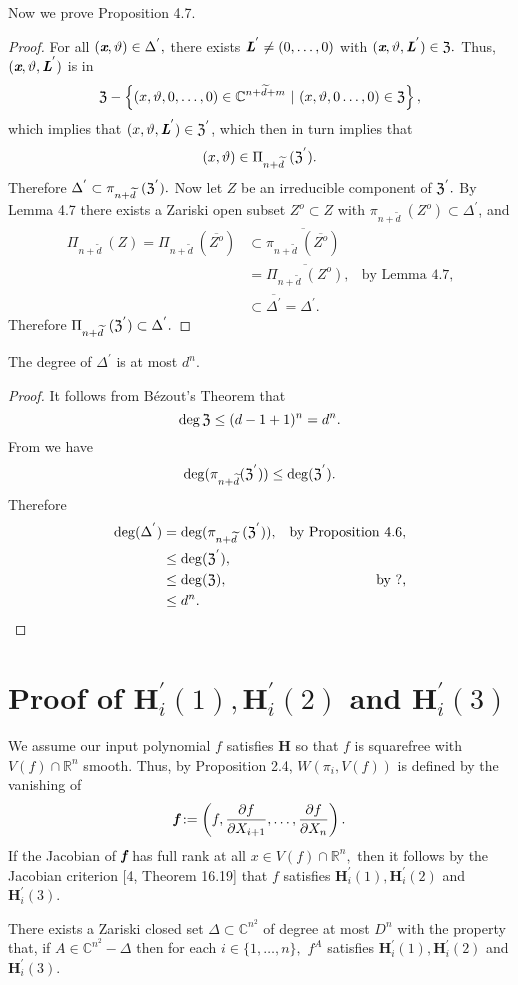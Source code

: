 \documentclass[sigconf]{acmart}
\def\fb{\textit{\textbf{f}}}
\def\C{\mathbb{C}}
\def\vt{\vartheta}
\def\dt{\widetilde{d}}
\def\pa{\partial}
\def\D{\Delta}
\def\Z{\frak{Z}}
\begin{document}
%
Now we prove Proposition 4.7.
%
\begin{proof}
For all $(\textit{\textbf{x}},\vt) \in \D^{'}, $ there exists $\textit{\textbf{L}}^{'} \not = (0,\hdots,0)$ with $(\textit{\textbf{x}},\vt,\textit{\textbf{L}}^{'}) \in \Z.$ Thus, $(\textit{\textbf{x}},\vt,\textit{\textbf{L}}^{'})$ is in
\[
     \Z - \left\{(x,\vt,0,\hdots,0) \in \C^{n+\dt+m}~|~(x,\vt,0\hdots,0) \in \Z\right\}, 
\]
which implies that $(x,\vt,\textit{\textbf{L}}^{'}) \in \Z^{'}$, which then in turn implies that
\[
    (x,\vt) \in \Pi_{n + \dt}~(\Z^{'}).
\]
Therefore $\D^{'} \subset \pi_{n+\dt}~(\Z^{'}).$
\newline \indent 
Now let $Z$ be an irreducible component of $\Z^{'}.$ By Lemma 4.7 there exists a Zariski open subset $Z^o \subset Z$ with $\pi_{n+\dt}~(Z^{o}) \subset \D^{'}$, and
%
\begin{align*}
 \Pi_{n+\dt}~(Z) = 
  \Pi_{n+\dt}~(\overline{Z^o})
  &\subset 
  \overline{\pi_{n+\dt}~(\overline{Z^o})}\\
  &=
  \overline{\Pi_{n+\dt}~(Z^o)}, &\textrm{by Lemma 4.7,}\\
  &\subset \overline{\D^{'}}=\D^{'}.
\end{align*}
%
   Therefore $\Pi_{n+\dt}~(\Z^{'}) \subset \D^{'}.$
\end{proof}
%
\begin{proposition} 
The degree of $\D^{'}$ is at most $d^n.$
\end{proposition} 
%
\begin{proof}
It follows from B\'ezout's Theorem that 
\[
\deg \frak{Z} \leq (d-1+1)^n=d^n.
\]
From \cite[Lemma 2]{H} we have 
\[
\deg(\pi_{n+\dt}(\Z^{'})) \leq \deg(\Z^{'}).
\]
Therefore 
%
\begin{align*}
\deg(\D^{'}) &= \deg(\pi_{n+\dt}~(\Z^{'})),&\textrm{by Proposition 4.6,}\\ 
            &\leq \deg(\Z^{'}),\\ 
            &\leq \deg(\Z), &\textrm{by ?,}\\ 
            &\leq d^n.
\end{align*}
%
\end{proof}
%
%
%
%
\section{Proof of $\textbf{H}_i^{'}(1),\textbf{H}_i^{'}(2)$ and $\textbf{H}_i^{'}(3)$}
%
We assume our input polynomial $f$ satisfies \textbf{H} so that $f$ is squarefree with $V(f) \cap \mathbb{R}^n$ smooth. Thus, by Proposition 2.4,  $W(\pi_i,V(f))$ is defined by the vanishing of \[\fb := \left(f,\frac{\pa f}{\pa X_{i+1}},\hdots,\frac{\pa f}{\pa X_n}\right).\]
If the Jacobian of $\fb$ has full rank at all $x \in V(f) \cap \mathbb{R}^n,$ then it follows by the Jacobian criterion [4, Theorem 16.19] that $f$ satisfies $\textbf{H}_i^{'}(1),\textbf{H}_i^{'}(2)$ and $\textbf{H}_i^{'}(3)$. 
%
\begin{theorem}
There exists a Zariski closed set $\Delta \subset \C^{n^2}$ of degree at most $D^n$ with the property that, if $A \in \C^{n^2} - \Delta$ then for each $i \in \{1,\hdots,n\},$ $f^A$ satisfies $\textbf{H}_i^{'}(1),\textbf{H}_i^{'}(2)$ and $\textbf{H}_i^{'}(3)$.
\end{theorem}
%
\end{document}
